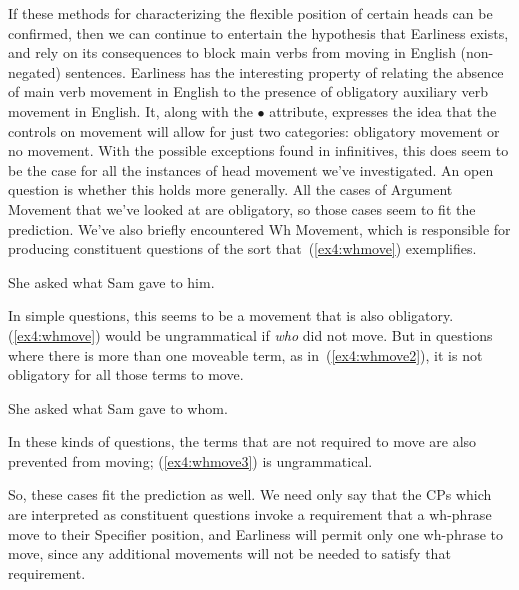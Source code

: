 If these methods for characterizing the flexible position of certain heads can be confirmed, then we can continue to entertain the hypothesis that Earliness exists, and rely on its consequences to block main verbs from moving in English (non-negated) sentences. Earliness has the interesting property of relating the absence of main verb movement in English to the presence of obligatory auxiliary verb movement in English. It, along with the $\bullet$ attribute, expresses the idea that the controls on movement will allow for just two categories: obligatory movement or no movement. With the possible exceptions found in infinitives, this does seem to be the case for all the instances of head movement we've investigated. An open question is whether this holds more generally. All the cases of Argument Movement that we've looked at are obligatory, so those cases seem to fit the prediction. We've also briefly encountered Wh Movement, which is responsible for producing constituent questions of the sort that~(\ref{ex4:whmove}) exemplifies.
\begin{exe}
	\ex \label{ex4:whmove} She asked \linkto what \under Sam gave \from{\ } to him.
\end{exe}
In simple questions, this seems to be a movement that is also obligatory. (\ref{ex4:whmove}) would be ungrammatical if \emph{who} did not move. But in questions where there is more than one moveable term, as in~(\ref{ex4:whmove2}), it is not obligatory for all those terms to move.
\begin{exe}
	\ex \label{ex4:whmove2} She asked what Sam gave to whom.
\end{exe}
In these kinds of questions, the terms that are not required to move are also prevented from moving; (\ref{ex4:whmove3}) is ungrammatical.
\begin{exe}
\end{exe}
So, these cases fit the prediction as well. We need only say that the CPs which are interpreted as constituent questions invoke a requirement that a wh-phrase move to their Specifier position, and Earliness will permit only one wh-phrase to move, since any additional movements will not be needed to satisfy that requirement.

